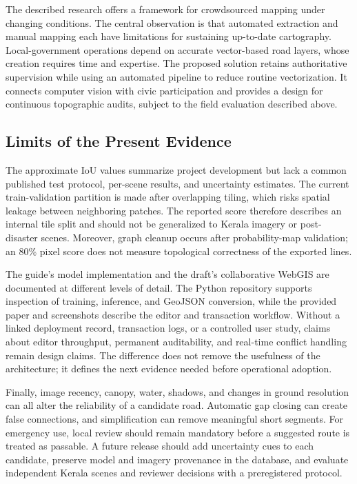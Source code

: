 \documentclass[10pt,a4paper,twocolumn]{article}
\begin{document}
The described research offers a framework for crowdsourced mapping under changing conditions. The central observation is that automated extraction and manual mapping each have limitations for sustaining up-to-date cartography. Local-government operations depend on accurate vector-based road layers, whose creation requires time and expertise. The proposed solution retains authoritative supervision while using an automated pipeline to reduce routine vectorization. It connects computer vision with civic participation and provides a design for continuous topographic audits, subject to the field evaluation described above.

\subsection{Limits of the Present Evidence}
The approximate IoU values summarize project development but lack a common published test protocol, per-scene results, and uncertainty estimates. The current train-validation partition is made after overlapping tiling, which risks spatial leakage between neighboring patches. The reported score therefore describes an internal tile split and should not be generalized to Kerala imagery or post-disaster scenes. Moreover, graph cleanup occurs after probability-map validation; an 80\% pixel score does not measure topological correctness of the exported lines.

The guide's model implementation and the draft's collaborative WebGIS are documented at different levels of detail. The Python repository supports inspection of training, inference, and GeoJSON conversion, while the provided paper and screenshots describe the editor and transaction workflow. Without a linked deployment record, transaction logs, or a controlled user study, claims about editor throughput, permanent auditability, and real-time conflict handling remain design claims. The difference does not remove the usefulness of the architecture; it defines the next evidence needed before operational adoption.

Finally, image recency, canopy, water, shadows, and changes in ground resolution can all alter the reliability of a candidate road. Automatic gap closing can create false connections, and simplification can remove meaningful short segments. For emergency use, local review should remain mandatory before a suggested route is treated as passable. A future release should add uncertainty cues to each candidate, preserve model and imagery provenance in the database, and evaluate independent Kerala scenes and reviewer decisions with a preregistered protocol.
\end{document}
